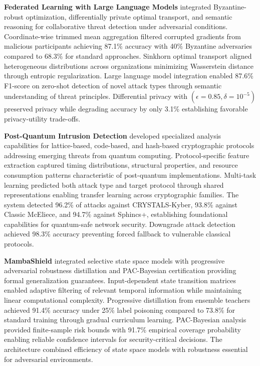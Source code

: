 \textbf{Federated Learning with Large Language Models} integrated Byzantine-robust optimization, differentially private optimal transport, and semantic reasoning for collaborative threat detection under adversarial conditions. Coordinate-wise trimmed mean aggregation filtered corrupted gradients from malicious participants achieving 87.1\% accuracy with 40\% Byzantine adversaries compared to 68.3\% for standard approaches. Sinkhorn optimal transport aligned heterogeneous distributions across organizations minimizing Wasserstein distance through entropic regularization. Large language model integration enabled 87.6\% F1-score on zero-shot detection of novel attack types through semantic understanding of threat principles. Differential privacy with $(\epsilon = 0.85, \delta = 10^{-5})$ preserved privacy while degrading accuracy by only 3.1\% establishing favorable privacy-utility trade-offs.

\textbf{Post-Quantum Intrusion Detection} developed specialized analysis capabilities for lattice-based, code-based, and hash-based cryptographic protocols addressing emerging threats from quantum computing. Protocol-specific feature extraction captured timing distributions, structural properties, and resource consumption patterns characteristic of post-quantum implementations. Multi-task learning predicted both attack type and target protocol through shared representations enabling transfer learning across cryptographic families. The system detected 96.2\% of attacks against CRYSTALS-Kyber, 93.8\% against Classic McEliece, and 94.7\% against Sphincs+, establishing foundational capabilities for quantum-safe network security. Downgrade attack detection achieved 98.3\% accuracy preventing forced fallback to vulnerable classical protocols.

\textbf{MambaShield} integrated selective state space models with progressive adversarial robustness distillation and PAC-Bayesian certification providing formal generalization guarantees. Input-dependent state transition matrices enabled adaptive filtering of relevant temporal information while maintaining linear computational complexity. Progressive distillation from ensemble teachers achieved 91.4\% accuracy under 25\% label poisoning compared to 73.8\% for standard training through gradual curriculum learning. PAC-Bayesian analysis provided finite-sample risk bounds with 91.7\% empirical coverage probability enabling reliable confidence intervals for security-critical decisions. The architecture combined efficiency of state space models with robustness essential for adversarial environments.

